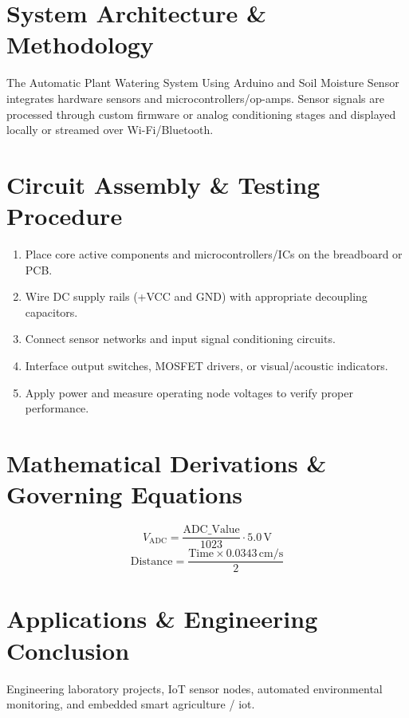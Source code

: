 \documentclass[11pt,a4paper]{article}
\begin{document}
\section{System Architecture \& Methodology}
The Automatic Plant Watering System Using Arduino and Soil Moisture Sensor integrates hardware sensors and microcontrollers/op-amps. Sensor signals are processed through custom firmware or analog conditioning stages and displayed locally or streamed over Wi-Fi/Bluetooth.

\section{Circuit Assembly \& Testing Procedure}
\begin{enumerate}
    \item Place core active components and microcontrollers/ICs on the breadboard or PCB.
    \item Wire DC supply rails (+VCC and GND) with appropriate decoupling capacitors.
    \item Connect sensor networks and input signal conditioning circuits.
    \item Interface output switches, MOSFET drivers, or visual/acoustic indicators.
    \item Apply power and measure operating node voltages to verify proper performance.
\end{enumerate}

\section{Mathematical Derivations \& Governing Equations}
\begin{equation}
V_{\text{ADC}} = \frac{\text{ADC\_Value}}{1023} \cdot 5.0\,\text{V}
\end{equation}
\begin{equation}
\text{Distance} = \frac{\text{Time} \times 0.0343\,\text{cm/s}}{2}
\end{equation}

\section{Applications \& Engineering Conclusion}
Engineering laboratory projects, IoT sensor nodes, automated environmental monitoring, and embedded smart agriculture / iot.
\end{document}
